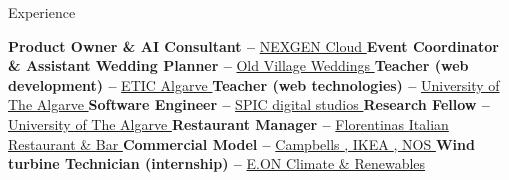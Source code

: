 \begin{rubric}{Experience}

  \entry*[\texttt{2022 –- ...~~~~~~~~~}]
  \textbf{Product Owner \& AI Consultant --}{
    \href{https://www.nexgencloud.co.uk/}{
      NEXGEN Cloud
      \color{MarkerColour!80!black}\faLink}}
  \entry*[\texttt{2013 –- ...~~~~~~~~~}]
  \textbf{Event Coordinator \& Assistant Wedding Planner --}{
    \href{https://oldvillageweddings.com/}{
      Old Village Weddings
      \color{MarkerColour!80!black}\faLink}}
  \entry*[\texttt{2022 –- 2022~~~~~~~~}]
  \textbf{Teacher (web development) --}{
    \href{https://eticalgarve.com/en/curso/programacao-web-e-mobile-2/}{
      ETIC Algarve
      \color{MarkerColour!80!black}\faLink}}
  \entry*[\texttt{2021 –- 2022~~~~~~~~}]
  \textbf{Teacher (web technologies) --}{
    \href{https://www.ualg.pt/}{
      University of The Algarve
      \color{MarkerColour!80!black}\faLink}}
  \entry*[\texttt{2019 –- 2022~~~~~~~~}]
  \textbf{Software Engineer --}{
    \href{https://spic.pt/}{
      SPIC digital studios
      \color{MarkerColour!80!black}\faLink}}
  \entry*[\texttt{2018 –- 2021~~~~~~~~}]
  \textbf{Research Fellow --}{
    \href{https://www.ualg.pt/}{
      University of The Algarve %
      \color{MarkerColour!80!black}\faLink}}
  \entry*[\texttt{2015 –- 2020~~~~~~~~}]
  \textbf{Restaurant Manager --}{
    \href{https://www.facebook.com/florentinasbarvilamoura/}{
      Florentina\textquotesingle s Italian Restaurant \& Bar
      \color{MarkerColour!80!black}\faLink}}
  \entry*[\texttt{2015 –- 2019~~~~~~~~}]
  \textbf{Commercial Model --}{
    \href{http://www.youtube.com/watch?v=emYXhDXjB2g&t=0m18s}{
      Campbell\textquotesingle s
      \color{MarkerColour!80!black}\faLink}
    \href{http://www.youtube.com/watch?v=SI6vUZZCXb8&t=0m21s}{
      , IKEA
      \color{MarkerColour!80!black}\faLink}
    \href{http://www.youtube.com/watch?v=vh04frxkgcU&t=0m34s}{
      , NOS
      \color{MarkerColour!80!black}\faLink}}
  \entry*[\texttt{2015 –- 2015~~~~~~~~}]
  \textbf{Wind turbine Technician (internship) --}{
    \href{https://www.eon.com/}{
      E.ON Climate \& Renewables
      \color{MarkerColour!80!black}\faLink}}


\end{rubric}
